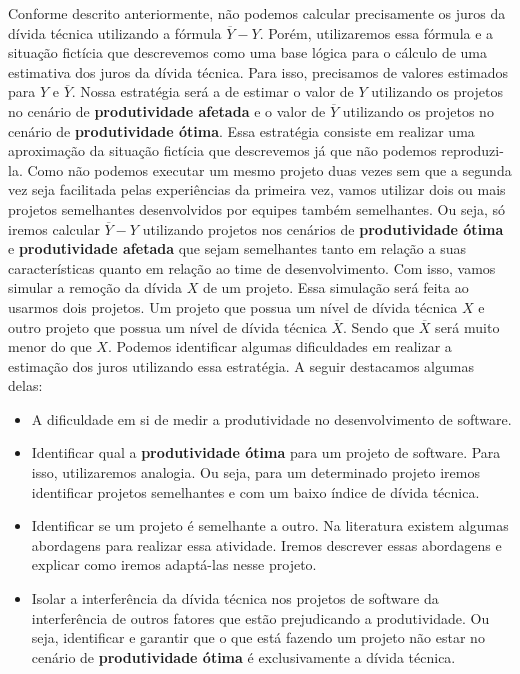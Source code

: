 Conforme descrito anteriormente, não podemos calcular precisamente os juros da dívida técnica utilizando a fórmula $\overline{Y} - Y$. Porém, utilizaremos essa fórmula e a situação fictícia que descrevemos como uma base lógica para o cálculo de uma estimativa dos juros da dívida técnica. Para isso, precisamos de valores estimados para $Y$ e $\overline{Y}$. Nossa estratégia será a de estimar o valor de $Y$ utilizando os projetos no cenário de \textbf{produtividade afetada} e o valor de $\overline{Y}$ utilizando os projetos no cenário de  \textbf{produtividade ótima}. Essa estratégia consiste em realizar uma aproximação da situação fictícia que descrevemos já que não podemos reproduzi-la.  Como não podemos executar um mesmo projeto duas vezes sem que a segunda vez seja facilitada pelas experiências da primeira vez, vamos utilizar dois ou mais projetos semelhantes desenvolvidos por equipes também semelhantes.  Ou seja, só iremos calcular  $\overline{Y} - Y$ utilizando projetos nos cenários de \textbf{produtividade ótima} e \textbf{produtividade afetada} que sejam semelhantes tanto em relação a suas características quanto em relação ao time de desenvolvimento. Com isso, vamos simular a remoção da dívida $X$ de um projeto. Essa simulação será feita ao usarmos dois projetos. Um projeto que possua um nível de dívida técnica $X$ e outro projeto que possua um nível de dívida técnica $\overline{X}$. Sendo que $\overline{X}$ será muito menor do que $X$. Podemos identificar algumas dificuldades em realizar a estimação dos juros utilizando essa estratégia. A seguir destacamos algumas delas:
 
 \begin{itemize}
 \item A dificuldade em si de medir a produtividade no desenvolvimento de software.
 \item Identificar qual a \textbf{produtividade ótima} para um projeto de software. Para isso, utilizaremos analogia. Ou seja, para um determinado projeto iremos identificar projetos semelhantes e com um baixo índice de dívida técnica.
 \item Identificar se um projeto é semelhante a outro. Na literatura existem algumas abordagens para realizar essa atividade. Iremos descrever essas abordagens e explicar como iremos adaptá-las nesse projeto.
 \item Isolar a interferência da dívida técnica nos projetos de software da interferência de outros fatores que estão prejudicando a produtividade. Ou seja, identificar e garantir que o que está fazendo um projeto não estar no cenário de \textbf{produtividade ótima} é exclusivamente a dívida técnica.
 \end{itemize}
 
